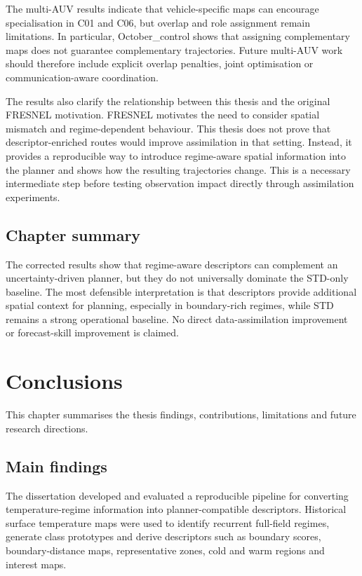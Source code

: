 The multi-AUV results indicate that vehicle-specific maps can encourage specialisation in C01 and C06, but overlap and role assignment remain limitations. In particular, October\_control shows that assigning complementary maps does not guarantee complementary trajectories. Future multi-AUV work should therefore include explicit overlap penalties, joint optimisation or communication-aware coordination.

The results also clarify the relationship between this thesis and the original FRESNEL motivation. FRESNEL motivates the need to consider spatial mismatch and regime-dependent behaviour. This thesis does not prove that descriptor-enriched routes would improve assimilation in that setting. Instead, it provides a reproducible way to introduce regime-aware spatial information into the planner and shows how the resulting trajectories change. This is a necessary intermediate step before testing observation impact directly through assimilation experiments.

\section{Chapter summary}

The corrected results show that regime-aware descriptors can complement an uncertainty-driven planner, but they do not universally dominate the STD-only baseline. The most defensible interpretation is that descriptors provide additional spatial context for planning, especially in boundary-rich regimes, while STD remains a strong operational baseline. No direct data-assimilation improvement or forecast-skill improvement is claimed.


\chapter{Conclusions} \label{chap:conclusions}

This chapter summarises the thesis findings, contributions, limitations and future research directions.

\section{Main findings}

The dissertation developed and evaluated a reproducible pipeline for converting temperature-regime information into planner-compatible descriptors. Historical surface temperature maps were used to identify recurrent full-field regimes, generate class prototypes and derive descriptors such as boundary scores, boundary-distance maps, representative zones, cold and warm regions and interest maps.

